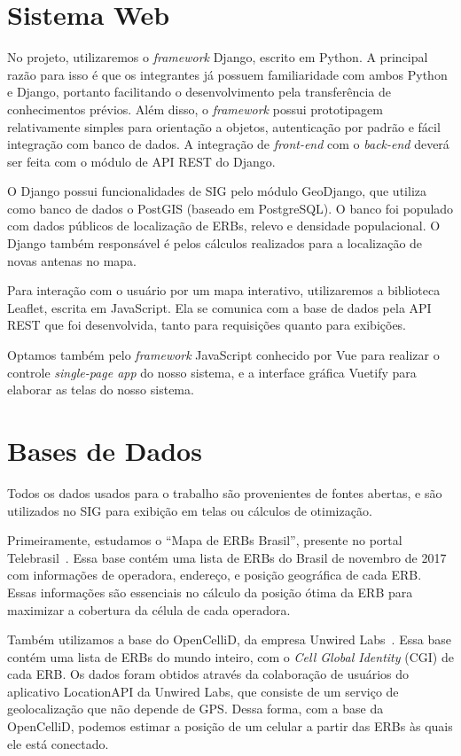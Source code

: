 \documentclass[]{politex}
\begin{document}
\section{Sistema Web}

No projeto, utilizaremos o \textit{framework} Django, escrito em Python. A
principal razão para isso é que os integrantes já possuem familiaridade com
ambos Python e Django, portanto facilitando o desenvolvimento pela transferência
de conhecimentos prévios. Além disso, o \textit{framework} possui prototipagem
relativamente simples para orientação a objetos, autenticação por padrão e fácil
integração com banco de dados. A integração de \textit{front-end} com o
\textit{back-end} deverá ser feita com o módulo de API REST do Django.

O Django possui funcionalidades de SIG pelo módulo GeoDjango, que utiliza como
banco de dados o PostGIS (baseado em PostgreSQL). O banco foi populado com dados
públicos de localização de ERBs, relevo e densidade populacional. O Django
também responsável é pelos cálculos realizados para a localização de novas
antenas no mapa.

Para interação com o usuário por um mapa interativo, utilizaremos a biblioteca
Leaflet, escrita em JavaScript. Ela se comunica com a base de dados pela API
REST que foi desenvolvida, tanto para requisições quanto para exibições.

Optamos também pelo \textit{framework} JavaScript conhecido por Vue para
realizar o controle \textit{single-page app} do nosso sistema, e a interface
gráfica Vuetify para elaborar as telas do nosso sistema.

\section{Bases de Dados}

Todos os dados usados para o trabalho são provenientes de fontes abertas, e são
utilizados no SIG para exibição em telas ou cálculos de otimização.

Primeiramente, estudamos o ``Mapa de ERBs Brasil'', presente no portal
Telebrasil~\cite{mapa-erb}. Essa base contém uma lista de ERBs do Brasil de
novembro de 2017 com informações de operadora, endereço, e posição geográfica de
cada ERB. Essas informações são essenciais no cálculo da posição ótima da ERB
para maximizar a cobertura da célula de cada operadora.

Também utilizamos a base do OpenCelliD, da empresa Unwired
Labs~\cite{opencellid}. Essa base contém uma lista de ERBs do mundo inteiro, com
o \textit{Cell Global Identity} (CGI) de cada ERB. Os dados foram
obtidos através da colaboração de usuários do aplicativo LocationAPI da Unwired
Labs, que consiste de um serviço de geolocalização que não depende de GPS. Dessa
forma, com a base da OpenCelliD, podemos estimar a posição de um celular a
partir das ERBs às quais ele está conectado.
\end{document}
